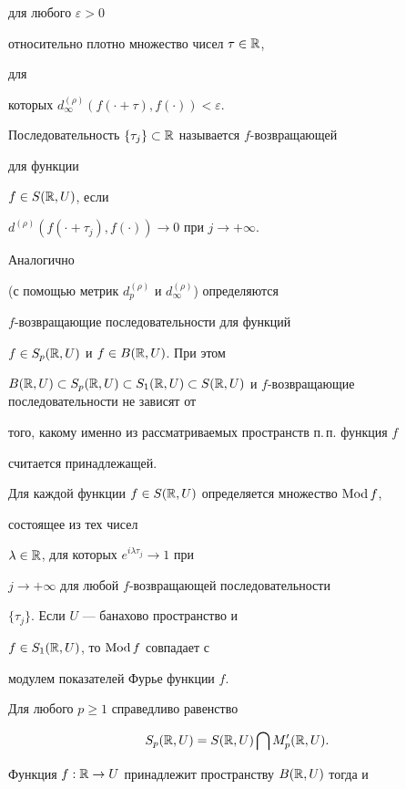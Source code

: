 для любого $\varepsilon>0$


относительно плотно множество чисел $\tau\in\Bbb R$,


для


которых $d^{(\rho)}_\infty(f(\cdot+\tau),f(\cdot))<\varepsilon$.


Последовательность $\{\tau_j\}\subset\Bbb R$ называется $f$-возвращающей


для функции


$f\in S(\Bbb R,U)$, если


$d^{(\rho)}(f(\cdot+\tau_j),f(\cdot))\to 0$ при $j\to+\infty$.


Аналогично


(с помощью метрик $d^{(\rho)}_p$ и $d^{(\rho)}_\infty$) определяются


$f$-возвращающие последовательности для функций


$f\in S_p(\Bbb R,U)$ и $f\in B(\Bbb R,U)$. При этом


$B(\Bbb R,U)\subset S_p(\Bbb R,U)\subset S_1(\Bbb R,U)


\subset S(\Bbb R,U)$ и $f$-возвращающие последовательности не зависят от


того, какому именно из рассматриваемых пространств п.\,п. функция $f$


считается принадлежащей.


Для каждой функции $f\in S(\Bbb R,U)$ определяется множество $\operatorname{Mod} f$,


состоящее из тех чисел


$\lambda\in\Bbb R$, для которых $e^{i\lambda\tau_j}\to 1$ при


$j\to+\infty$ для любой $f$-возвращающей последовательности


$\{\tau_j\}$. Если $U$ --- банахово пространство и


$f\in S_1(\Bbb R,U)$, то $\operatorname{Mod} f$ совпадает с


модулем показателей Фурье функции $f$.





Для любого $p\ge 1$ справедливо равенство \cite{8}


\begin{equation}


S_p(\Bbb R,U)=S(\Bbb R,U)\bigcap M'_p(\Bbb R,U).


\end{equation}


Функция $f:\Bbb R\to U$ принадлежит пространству $B(\Bbb R,U)$ тогда и


